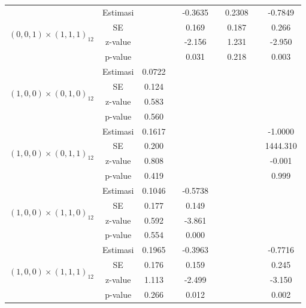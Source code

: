 \begin{enumerate}[label=\alph*.]
\begin{longtable}{|c|c|c|c|c|c|c|c|c|}
            \multirow{4}{*}{$(0,0,1)\times(1,1,1)_{12}$}
            & Estimasi & {} & {} & -0.3635 & {} & 0.2308 & {} & -0.7849 \\ \cline{2-9}
            & SE       & {} & {} & 0.169   & {} & 0.187 & {} & 0.266\\ \cline{2-9}
            & z-value  & {} & {} & -2.156  & {} & 1.231 & {} & -2.950\\ \cline{2-9}
            & p-value  & {} & {} & 0.031   & {} & 0.218 & {} & 0.003\\ \hline

            \multirow{4}{*}{$(1,0,0)\times(0,1,0)_{12}$}
            & Estimasi & 0.0722  & {} & {} & {} & {} & {} & {} \\ \cline{2-9}
            & SE       & 0.124 & {} & {} & {} & {} & {} & {} \\ \cline{2-9}
            & z-value  & 0.583   & {} & {} & {} & {} & {} & {}\\ \cline{2-9}
            & p-value  & 0.560 & {} & {} & {} & {} & {} & {} \\ \hline

            \multirow{4}{*}{$(1,0,0)\times(0,1,1)_{12}$}
            & Estimasi & 0.1617  & {} & {} & {} & {} & {} & -1.0000 \\ \cline{2-9}
            & SE       & 0.200  & {} & {} & {} & {} & {} & 1444.310\\ \cline{2-9}
            & z-value  & 0.808   & {} & {} & {} & {} & {} & -0.001\\ \cline{2-9}
            & p-value  & 0.419 & {} & {} & {} & {} & {} & 0.999\\ \hline

            \multirow{4}{*}{$(1,0,0)\times(1,1,0)_{12}$}
            & Estimasi & 0.1046  & {} & -0.5738 & {} & {} & {} & {}\\ \cline{2-9}
            & SE       & 0.177  & {} & 0.149 & {} & {} & {} & {}\\ \cline{2-9}
            & z-value  & 0.592   & {} & -3.861 & {} & {} & {}& {}\\ \cline{2-9}
            & p-value  & 0.554 & {} & 0.000 & {} & {} & {} & {}\\ \hline

            \multirow{4}{*}{$(1,0,0)\times(1,1,1)_{12}$}
            & Estimasi & 0.1965  & {} & -0.3963 & {} & {} & {} & -0.7716 \\ \cline{2-9}
            & SE       & 0.176    & {} & 0.159 & {} & {} & {} & 0.245\\ \cline{2-9}
            & z-value  & 1.113   & {} & -2.499 & {} & {} & {} & -3.150\\ \cline{2-9}
            & p-value  & 0.266    & {} &  0.012 & {} & {} & {} & 0.002\\ \hline


\end{longtable}
\end{enumerate}
